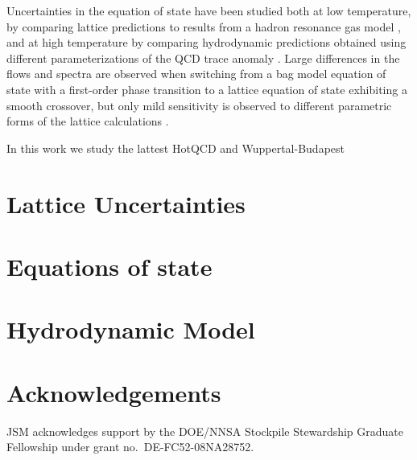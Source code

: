 \documentclass[aps,prc,reprint,amsmath,nofootinbib,superscriptaddress]{revtex4-1}
\begin{document}
Uncertainties in the equation of state have been studied both at low temperature, by comparing lattice predictions to results from a hadron resonance gas model
\cite{Huovinen:2009yb}, and at high temperature by comparing hydrodynamic predictions obtained using different parameterizations of the QCD trace anomaly 
\cite{Huovinen:2005gy, Huovinen:2009yb}. Large differences in the flows and spectra are observed when switching from a bag model equation of state with a first-order 
phase transition to a lattice equation of state exhibiting a smooth crossover, but only mild sensitivity is observed to different parametric forms of the lattice 
calculations \cite{Huovinen:2009yb}.

In this work we study the lattest HotQCD and Wuppertal-Budapest 





\section{Lattice Uncertainties}

\section{Equations of state}


\section{Hydrodynamic Model}

\section{Acknowledgements}

\medskip
JSM acknowledges support by the DOE/NNSA Stockpile Stewardship Graduate Fellowship under grant no.~DE-FC52-08NA28752.

%
\end{document}

